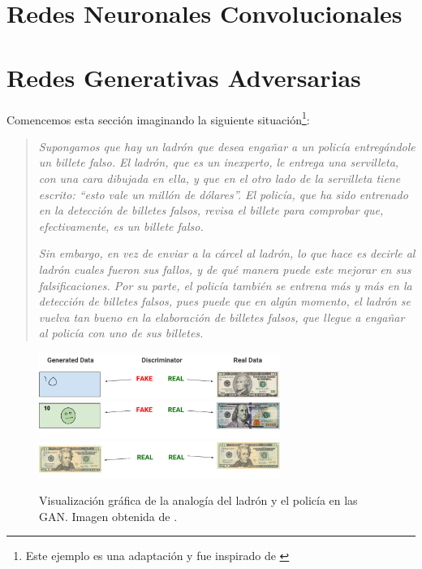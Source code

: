 {{}  %


\section{Redes Neuronales Convolucionales}\label{sec:redes-neuronales-convolucionales}
{
}  %


\section{Redes Generativas Adversarias}\label{sec:redes-generativas-adversarias-GAN}
{
Comencemos esta sección imaginando la siguiente situación\footnote{Este ejemplo es una adaptación y fue inspirado de \cite[min. 4:32]{santana2017creando}}:
\begin{quotation}
    \textit{Supongamos que hay un ladrón que desea engañar a un policía entregándole un billete falso. El ladrón, que es un inexperto, le entrega una servilleta, con una cara dibujada en ella, y que en el otro lado de la servilleta tiene escrito: ``\emph{esto vale un millón de dólares}''. El policía, que ha sido entrenado en la detección de billetes falsos, revisa el billete para comprobar que, efectivamente, es un billete falso.}

    \textit{Sin embargo, en vez de enviar a la cárcel al ladrón, lo que hace es decirle al ladrón cuales fueron sus fallos, y de qué manera puede este mejorar en sus falsificaciones. Por su parte, el policía también se entrena más y más en la detección de billetes falsos, pues puede que en algún momento, el ladrón se vuelva tan bueno en la elaboración de billetes falsos, que llegue a engañar al policía con uno de sus billetes.}
\end{quotation}

\begin{figure}[htbp]
    \centering
    \includegraphics[width=0.7\textwidth]{img/gan/bad_gan.pdf}\vspace{0.6cm}
    \includegraphics[width=0.7\textwidth]{img/gan/ok_gan.pdf}
    \includegraphics[width=0.7\textwidth]{img/gan/good_gan.pdf}
    \caption{Visualización gráfica de la analogía del ladrón y el policía en las GAN. Imagen obtenida de \cite{googlegan}.}
    \label{fig:gan-analogy}
\end{figure}

}}
